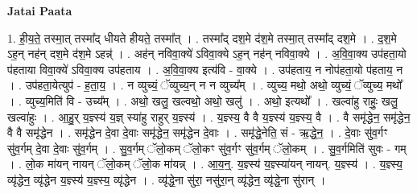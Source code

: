 \documentclass[17pt]{extarticle}
\begin{document}
\textbf{Jatai Paata} \newline

1. ही॒य॒ते॒ तस्मा॒त् तस्मा᳚द् धीयते हीयते॒ तस्मा᳚त् । . तस्मा᳚द् दश॒मे द॑श॒मे तस्मा॒त् तस्मा᳚द् दश॒मे । . द॒श॒मे ऽह॒न् नह॑न् दश॒मे द॑श॒मे ऽहन्न्॑ । . अह॑न् नविवा॒क्ये॑ ऽविवा॒क्ये ऽह॒न् नह॑न् नविवा॒क्ये । . अ॒वि॒वा॒क्य उप॑हता॒यो प॑हताया विवा॒क्ये॑ ऽविवा॒क्य उप॑हताय । . अ॒वि॒वा॒क्य इत्य॑वि - वा॒क्ये । . उप॑हताय॒ न नोप॑हता॒यो प॑हताय॒ न । . उप॑हता॒येत्युप॑ - ह॒ता॒य॒ । . न व्युच्यं॒ ॅव्युच्य॒न् न न व्युच्य᳚म् । . व्युच्य॒ मथो॒ अथो॒ व्युच्यं॒ ॅव्युच्य॒ मथो᳚ । . व्युच्य॒मिति॑ वि - उच्य᳚म् । . अथो॒ खलु॒ खल्वथो॒ अथो॒ खलु॑ । . अथो॒ इत्यथो᳚ । . खल्वा॑हु राहुः॒ खलु॒ खल्वा॑हुः । . आ॒हु॒र् य॒ज्ञ्स्य॑ य॒ज्ञ् स्या॑हु राहुर् य॒ज्ञ्स्य॑ । . य॒ज्ञ्स्य॒ वै वै य॒ज्ञ्स्य॑ य॒ज्ञ्स्य॒ वै । . वै समृ॑द्धेन॒ समृ॑द्धेन॒ वै वै समृ॑द्धेन । . समृ॑द्धेन दे॒वा दे॒वाः समृ॑द्धेन॒ समृ॑द्धेन दे॒वाः । . समृ॑द्धे॒नेति॒ सं - ऋ॒द्धे॒न॒ । . दे॒वाः सु॑व॒र्गꣳ सु॑व॒र्गम् दे॒वा दे॒वाः सु॑व॒र्गम् । . सु॒व॒र्गम् ॅलो॒कम् ॅलो॒कꣳ सु॑व॒र्गꣳ सु॑व॒र्गम् ॅलो॒कम् । . सु॒व॒र्गमिति॑ सुवः - गम् । . लो॒क मा॑यन् नायन् ॅलो॒कम् ॅलो॒क मा॑यन्न् । . आ॒य॒न्॒. य॒ज्ञ्स्य॑ य॒ज्ञ्स्या॑यन् नायन्. य॒ज्ञ्स्य॑ । . य॒ज्ञ्स्य॒ व्यृ॑द्धेन॒ व्यृ॑द्धेन य॒ज्ञ्स्य॑ य॒ज्ञ्स्य॒ व्यृ॑द्धेन । . व्यृ॑द्धे॒ना सु॑रा॒ नसु॑रा॒न् व्यृ॑द्धेन॒ व्यृ॑द्धे॒ना सु॑रान् । \newline
\end{document}
